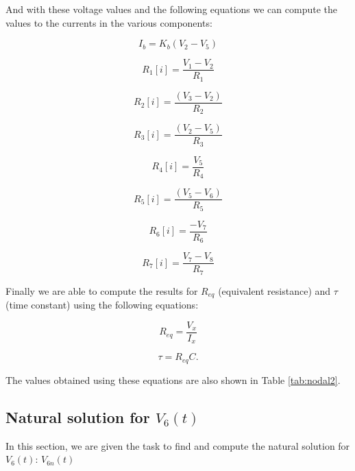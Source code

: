 And with these voltage values and the following equations we can compute the values to the currents in the various components:

\begin{equation}
I_b = K_b(V_2 - V_5)
\end{equation}

\begin{equation}
R_1[i] = \frac{V_1 - V_2}{R_1}
\end{equation}

\begin{equation}
R_2[i] = \frac{(V_3 - V_2)}{R_2}
\end{equation}

\begin{equation}
R_3[i] = \frac{(V_2 - V_5)}{R_3}
\end{equation}

\begin{equation}
R_4[i] = \frac{V_5}{R_4}
\end{equation}

\begin{equation}
R_5[i] = \frac{(V_5 - V_6)}{R_5}
\end{equation}

\begin{equation}
R_6[i] = \frac{-V_7}{R_6}
\end{equation}

\begin{equation}
R_7[i] = \frac{V_7 - V_8}{R_7}
\end{equation}

Finally we are able to compute the results for $R_{eq}$ (equivalent resistance) and $\tau$ (time constant) using the following equations:

\begin{equation}
R_{eq} = \frac{V_x}{I_x}
\end{equation}

\begin{equation}
\tau = R_{eq}C.
\end{equation}

The values obtained using these equations are also shown in Table \ref{tab:nodal2}.

\subsection{Natural solution for $V_{6}(t)$}

In this section, we are given the task to find and compute the natural solution for $V_{6}(t)$: $V_{6n}(t)$

